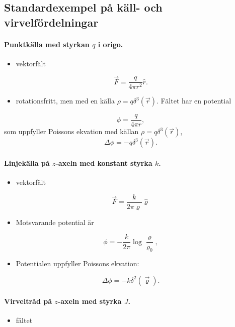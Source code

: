 \documentclass[%
oneside,                 %
final,                   %
10pt]{article}
\begin{document}
\subsection*{Standardexempel på käll- och virvelfördelningar}

\paragraph{Punktkälla med styrkan $q$ i origo.}
\begin{itemize}
\item vektorfält 
\end{itemize}

\noindent
$$
\vec F=\frac{q}{4\pi r^2}\hat r.
$$
\begin{itemize}
\item rotationsfritt, men med en källa $\rho=q\delta^3(\vec{r})$. Fältet har en potential
\end{itemize}

\noindent
$$
\phi=\frac{q}{4\pi r},
$$
som uppfyller Poissons ekvation med källan $\rho=q\delta^3(\vec{r})$, 
$$
\Delta\phi=-q\delta^3(\vec{r}).
$$

\paragraph{Linjekälla på $z$-axeln med konstant styrka $k$.}
\begin{itemize}
\item vektorfält
\end{itemize}

\noindent
$$
\vec F=\frac{k}{2\pi\varrho}\hat\varrho
$$
\begin{itemize}
\item Motsvarande potential är 
\end{itemize}

\noindent
$$
\phi=-\frac{k}{2\pi}\log\frac{\varrho}{\varrho_0},
$$
\begin{itemize}
\item Potentialen uppfyller Poissons ekvation:
\end{itemize}

\noindent
$$
\Delta\phi=-k\delta^2(\vec{\varrho}).
$$

\paragraph{Virveltråd på $z$-axeln med styrka $J$.}
\begin{itemize}
\item fältet 
\end{itemize}
\end{document}

